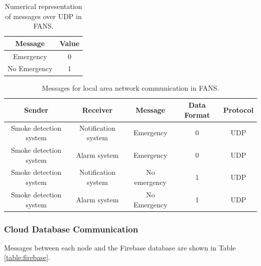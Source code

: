\begin{table}
    \centering
    \footnotesize
    \begin{tabular}{| c | c |}
        \hline
        Message      & Value \\
        \hline
        Emergency    & 0     \\
        \hline
        No Emergency & 1     \\
        \hline
    \end{tabular}
    \caption{Numerical representation of messages over UDP in FANS.}
    \label{table:udp-rep}
\end{table}

\begin{table}
    \centering
    \footnotesize
    \begin{tabular}{| c | c | c | c | c |}
        \hline
        Sender                 & Receiver            & Message      & Data Format & Protocol \\
        \hline
        Smoke detection system & Notification system & Emergency    & 0           & UDP      \\
        \hline
        Smoke detection system & Alarm system        & Emergency    & 0           & UDP      \\
        \hline
        Smoke detection system & Notification system & No emergency & 1           & UDP      \\
        \hline
        Smoke detection system & Alarm system        & No Emergency & 1           & UDP      \\
        \hline
    \end{tabular}
    \caption{Messages for local area network communication in FANS.}
    \label{table:udp-messages}
\end{table}

\subsubsection{Cloud Database Communication}

Messages between each node and the Firebase database are shown in Table \ref{table:firebase}.

